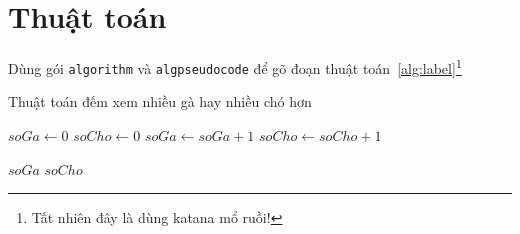 \section{Thuật toán}
Dùng gói \texttt{algorithm} và \texttt{algpseudocode} để gõ đoạn thuật toán~\ref{alg:label}\footnote{Tất nhiên đây là dùng katana mổ ruồi!}

\begin{algorithm}
\caption{Thuật toán đếm xem nhiều gà hay nhiều chó hơn}
\label{alg:label}
\begin{algorithmic}
\State $soGa \gets 0$
\State $soCho \gets 0$
\State $soGa \gets soGa + 1$
\EndFor
{}
\State $soCho \gets soCho + 1$
\EndFor

\State\Return $soGa$
\State\Return $soCho$
\Else 
\State\Return {}
\EndIf
\EndFunction
\end{algorithmic}
\end{algorithm}